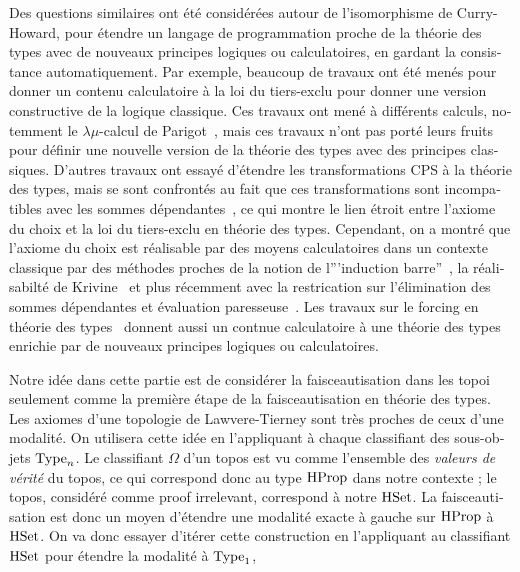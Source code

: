 \begin{otherlanguage}{french}
Des questions similaires ont été considérées autour de l'isomorphisme
de Curry-Howard, pour étendre un langage de programmation proche de la
théorie des types avec de nouveaux principes logiques ou
calculatoires, en gardant la consistance automatiquement.
Par exemple, beaucoup de travaux ont été menés pour donner un contenu
calculatoire à la loi du tiers-exclu pour donner une version
constructive de la logique classique. Ces travaux ont mené à
différents calculs, notemment le $\lambda\mu$-calcul de
Parigot~\cite{parigot1993classical}, mais ces travaux n'ont pas porté
leurs fruits pour définir une nouvelle version de la théorie des types
avec des principes classiques.
D'autres travaux ont essayé d'étendre les transformations CPS à la
théorie des types, mais se sont confrontés au fait que ces
transformations sont incompatibles avec les sommes
dépendantes~\cite{barthe2002cps}, ce qui montre le lien étroit entre
l'axiome du choix et la loi du tiers-exclu en théorie des
types. Cependant, on a montré que l'axiome du choix est réalisable par
des moyens calculatoires dans un contexte classique par des méthodes
proches de la notion de l'''induction
barre''~\cite{berardi1998computational}, la réalisabilté de
Krivine~\cite{krivine2003dependent} et plus récemment avec la
restrication sur l'élimination des sommes dépendantes et évaluation
paresseuse~\cite{herbelin2012constructive}.
Les travaux sur le forcing en théorie des
types~\cite{jaber2012extending,forcing2016} 
donnent aussi un contnue calculatoire à une théorie des types enrichie
par de nouveaux principes logiques ou calculatoires.

Notre idée dans cette partie est de considérer la faisceautisation
dans les topoi seulement comme la première étape de la
faisceautisation en théorie des types. Les axiomes d'une topologie de
Lawvere-Tierney sont très proches de ceux d'une modalité. On utilisera
cette idée en l'appliquant à chaque classifiant des sous-objets
$\operatorname{Type}_n$.
Le classifiant $\Omega$ d'un topos est vu comme l'ensemble des {\em
  valeurs de vérité} du topos, ce qui correspond donc au type $\operatorname{HProp}$
dans notre contexte ; le topos, considéré comme proof irrelevant,
correspond à notre $\operatorname{HSet}$. La faisceautisation est donc un moyen
d'étendre une modalité exacte à gauche sur $\operatorname{HProp}$ à $\operatorname{HSet}$. On va
donc essayer d'itérer cette construction en l'appliquant au
classifiant $\operatorname{HSet}$ pour étendre la modalité à $\operatorname{Type}_1$, \etc{}


\end{otherlanguage}
